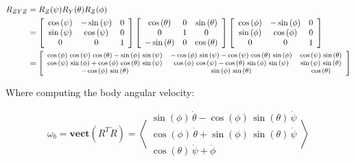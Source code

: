 \documentclass[12pt, letterpaper]{../assignment}
\begin{document}
\begin{equation*}
  \begin{aligned}
    R_{ZYZ} &= R_{Z}(\psi) R_{Y}(\theta) R_{Z}(\phi) \\
    &= \left[\begin{array}{ccc} \cos\left(\psi \right) & -\sin\left(\psi \right) & 0\\ \sin\left(\psi \right) & \cos\left(\psi \right) & 0\\ 0 & 0 & 1 \end{array}\right]
    \left[\begin{array}{ccc} \cos\left(\theta \right) & 0 & \sin\left(\theta \right)\\ 0 & 1 & 0\\ -\sin\left(\theta \right) & 0 & \cos\left(\theta \right) \end{array}\right]
    \left[\begin{array}{ccc} \cos\left(\phi \right) & -\sin\left(\phi \right) & 0\\ \sin\left(\phi \right) & \cos\left(\phi \right) & 0\\ 0 & 0 & 1 \end{array}\right]\\
    &= \footnotesize{\left[\begin{array}{ccc}
      \cos \left(\phi \right)\,\cos \left(\psi \right)\,\cos \left(\theta \right)-\sin \left(\phi \right)\,\sin \left(\psi \right) & -\cos \left(\phi \right)\,\sin \left(\psi \right)-\cos \left(\psi \right)\,\cos \left(\theta \right)\,\sin \left(\phi \right) & \cos \left(\psi \right)\,\sin \left(\theta \right)\\
      \cos \left(\psi \right)\,\sin \left(\phi \right)+\cos \left(\phi \right)\,\cos \left(\theta \right)\,\sin \left(\psi \right) & \cos \left(\phi \right)\,\cos \left(\psi \right)-\cos \left(\theta \right)\,\sin \left(\phi \right)\,\sin \left(\psi \right) & \sin \left(\psi \right)\,\sin \left(\theta \right)\\
      -\cos \left(\phi \right)\,\sin \left(\theta \right) & \sin \left(\phi \right)\,\sin \left(\theta \right) & \cos \left(\theta \right)
      \end{array}\right]}
  \end{aligned}
\end{equation*}


Where computing the body angular velocity:

$$ \omega_b = \textbf{vect}\left(  R^T \dot{R} \right) =
\left<\begin{array}{c} \sin\left(\phi \right)\,\dot{\theta} -\cos\left(\phi \right)\,\sin\left(\theta \right)\,\dot{\psi} \\ \cos\left(\phi \right)\,\dot{\theta} +\sin\left(\phi \right)\,\sin\left(\theta \right)\,\dot{\psi} \\ \cos\left(\theta \right)\,\dot{\psi} +\dot{\phi}  \end{array}\right>$$
\end{document}
